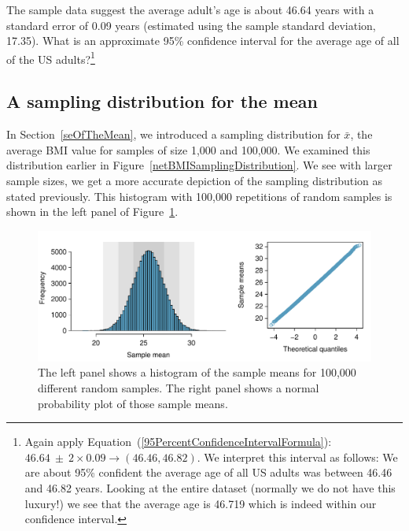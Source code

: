 
\begin{exercise} \label{95CIExerciseForAgeOfRun10Samp1}
The sample data suggest the average adult's age is about 46.64 years with a standard error of 0.09 years (estimated using the sample standard deviation, 17.35). What is an approximate 95\% confidence interval for the average age of all of the US adults?\footnote{Again apply Equation~(\ref{95PercentConfidenceIntervalFormula}): $46.64 \ \pm \ 2\times 0.09 \rightarrow (46.46, 46.82)$. We interpret this interval as follows: We are about 95\% confident the average age of all US adults was between 46.46 and 46.82 years. Looking at the entire dataset (normally we do not have this luxury!) we see that the average age is 46.719 which is indeed within our confidence interval.}
\end{exercise}

\subsection{A sampling distribution for the mean}
\label{sampdistmean}

In Section~\ref{seOfTheMean}, we introduced a sampling distribution for $\bar{x}$, the average BMI value for samples of size 1,000 and 100,000. We examined this distribution earlier in Figure~\ref{netBMISamplingDistribution}. We see with larger sample sizes, we get a more accurate depiction of the sampling distribution as stated previously. This histogram with 100,000 repetitions of random samples is shown in the left panel of Figure~\ref{netTimeBigSamplingDistribution}.

\begin{figure}[hht]
   \centering
   \includegraphics[width=\textwidth]{ch_inference_foundations_oi_biostat/figures/netTimeBigSamplingDistribution/netTimeBigSamplingDistributionbrfss}
   \caption{The left panel shows a histogram of the sample means for 100,000 different random samples. The right panel shows a normal probability plot of those sample means.}
   \label{netTimeBigSamplingDistribution}
\end{figure}

